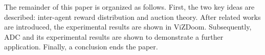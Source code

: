 The remainder of this paper is organized as follows. 
First, the two key ideas are described: inter-agent reward distribution and auction theory. 
After related works are introduced, the experimental results are shown in ViZDoom.
Subsequently, ADC and its experimental results are shown to demonstrate a further application. 
Finally, a conclusion ends the paper.
